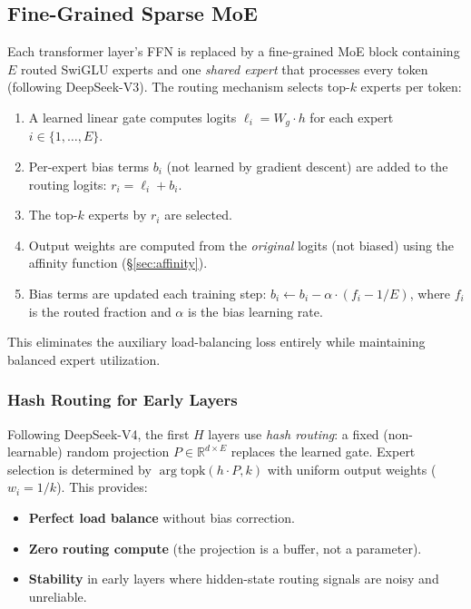 \documentclass[11pt,a4paper]{article}
\begin{document}
\subsection{Fine-Grained Sparse MoE}
\label{sec:fgmoe}

Each transformer layer's FFN is replaced by a fine-grained MoE block containing
$E$ routed SwiGLU experts and one \emph{shared expert} that processes every
token (following DeepSeek-V3). The routing mechanism selects top-$k$ experts
per token:

\begin{enumerate}[leftmargin=*]
  \item A learned linear gate computes logits $\ell_i = W_g \cdot h$ for each
    expert $i \in \{1, \ldots, E\}$.
  \item Per-expert bias terms $b_i$ (not learned by gradient descent) are added
    to the routing logits: $r_i = \ell_i + b_i$.
  \item The top-$k$ experts by $r_i$ are selected.
  \item Output weights are computed from the \emph{original} logits (not biased)
    using the affinity function (\S\ref{sec:affinity}).
  \item Bias terms are updated each training step:
    $b_i \leftarrow b_i - \alpha \cdot (f_i - 1/E)$, where $f_i$ is the
    routed fraction and $\alpha$ is the bias learning rate.
\end{enumerate}

This eliminates the auxiliary load-balancing loss entirely while maintaining
balanced expert utilization.

\subsubsection{Hash Routing for Early Layers}
\label{sec:hash}

Following DeepSeek-V4, the first $H$ layers use \emph{hash routing}: a fixed
(non-learnable) random projection $P \in \mathbb{R}^{d \times E}$ replaces the
learned gate. Expert selection is determined by $\arg\text{topk}(h \cdot P, k)$
with uniform output weights ($w_i = 1/k$). This provides:

\begin{itemize}[leftmargin=*]
  \item \textbf{Perfect load balance} without bias correction.
  \item \textbf{Zero routing compute} (the projection is a buffer, not a parameter).
  \item \textbf{Stability} in early layers where hidden-state routing signals
    are noisy and unreliable.
\end{itemize}
\end{document}
